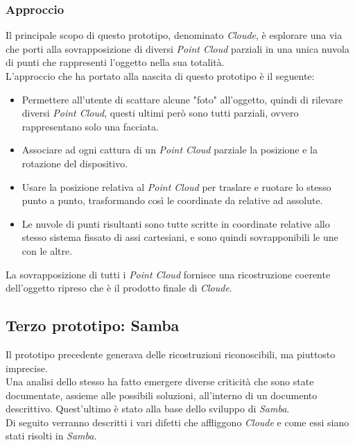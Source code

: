 \subsubsection{Approccio}
Il principale scopo di questo prototipo, denominato \emph{Cloude}, è esplorare una via che porti alla sovrapposizione di diversi \emph{Point Cloud} parziali in una unica nuvola di punti che rappresenti l'oggetto nella sua totalità.\\
L'approccio che ha portato alla nascita di questo prototipo è il seguente:
\begin{itemize}
	\item Permettere all'utente di scattare alcune "foto" all'oggetto, quindi di rilevare diversi \emph{Point Cloud}, questi ultimi però sono tutti parziali, ovvero rappresentano solo una facciata.
	\item Associare ad ogni cattura di un \emph{Point Cloud} parziale la posizione e la rotazione del dispositivo.
	\item Usare la posizione relativa al \emph{Point Cloud} per traslare e ruotare lo stesso punto a punto, trasformando così le coordinate da relative ad assolute.
	\item Le nuvole di punti risultanti sono tutte scritte in coordinate relative allo stesso sistema fissato di assi cartesiani, e sono quindi sovrapponibili le une con le altre.
\end{itemize}
La sovrapposizione di tutti i \emph{Point Cloud} fornisce una ricostruzione coerente dell'oggetto ripreso che è il prodotto finale di \emph{Cloude}.

\subsection{Terzo prototipo: Samba}
Il prototipo precedente generava delle ricostruzioni riconoscibili, ma piuttosto imprecise.\\
Una analisi dello stesso ha fatto emergere diverse criticità che sono state documentate, assieme alle possibili soluzioni, all'interno di un documento descrittivo. Quest'ultimo è stato alla base dello sviluppo di \emph{Samba}.\\
Di seguito verranno descritti i vari difetti che affliggono \emph{Cloude} e come essi siano stati risolti in \emph{Samba}.
